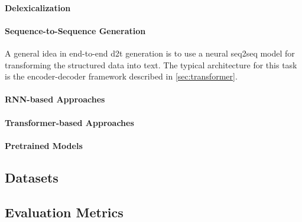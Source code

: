 \paragraph{Delexicalization}

\paragraph{Sequence-to-Sequence Generation} A general idea in end-to-end \ac{d2t} generation is to use a neural \ac{seq2seq} model for transforming the structured data into text.  The typical architecture for this task is the encoder-decoder framework described in \autoref{sec:transformer}.

\paragraph{RNN-based Approaches}

\paragraph{Transformer-based Approaches}

\paragraph{Pretrained Models}

\subsection{Datasets}
\label{sec:datasets}
\subsection{Evaluation Metrics}
\label{sec:evaluation}